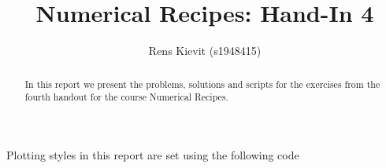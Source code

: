 \documentclass[a4paper,10pt]{article}
\title{Numerical Recipes: Hand-In 4}
\author{Rens Kievit (s1948415)}
\begin{document}
\maketitle

\begin{abstract}
    In this report we present the problems, solutions and scripts for the exercises from the fourth handout for the course Numerical Recipes.
\end{abstract}

Plotting styles in this report are set using the following code






\end{document}
